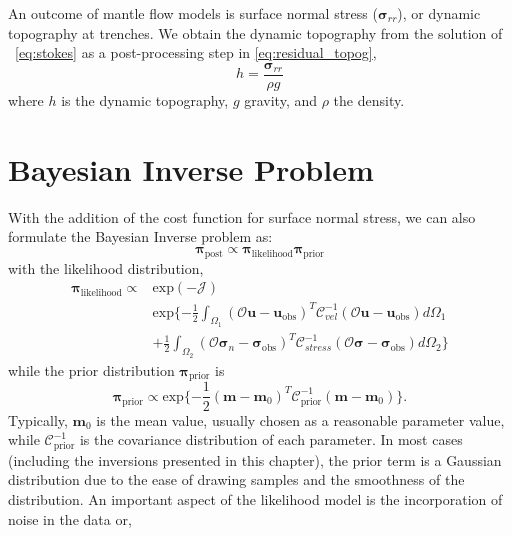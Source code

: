 \documentclass[12pt]{article}
\newcommand{\mm}{{\ensuremath{\boldsymbol{m}}}}
\newcommand{\uu}{{\ensuremath{\boldsymbol{u}}}}
\newcommand{\ppi}{{\ensuremath{\boldsymbol{\pi}}}}
\newcommand{\ssigma}{{\ensuremath{\boldsymbol{\sigma}}}}
\begin{document}
An outcome of mantle flow models is surface normal stress ($\ssigma_{rr}$), or dynamic topography at trenches. We obtain the dynamic topography from the solution of ~\eqref{eq:stokes} as a post-processing step in \eqref{eq:residual_topog},
\begin{equation}
h= \frac{\ssigma_{rr}}{\rho g}
\label{eq:residual_topog}
\end{equation}
where $h$ is the dynamic topography, $g$ gravity, and $\rho$ the density. 


 
\section*{Bayesian Inverse Problem}
With the addition of the cost function for surface normal stress, we can also formulate the Bayesian Inverse problem as:
\begin{equation}
\ppi_{\text{post}} \propto \ppi_{\text{likelihood}}\ppi_{\text{prior}}
\end{equation}
with the likelihood distribution,
\begin{equation}
\begin{split}
\ppi_{\text{likelihood}} \propto & \text{exp}(-\mathcal{J}) \\
                           & \text{exp}\{-\frac{1}{2}\int_{\Omega_1} (\mathcal{O}\uu-\uu_{\text{obs}})^T\mathcal{C}^{-1}_{vel}(\mathcal{O}\uu-\uu_{\text{obs}})d\Omega_1 \\
&+ \frac{1}{2}\int_{\Omega_2} (\mathcal{O}\ssigma_n-\ssigma_{\text{obs}})^T\mathcal{C}^{-1}_{stress}(\mathcal{O}\ssigma -\ssigma_{\text{obs}})d\Omega_2 \} 
\end{split}
\end{equation}
while the prior distribution $\ppi_{\text{prior}}$ is
\begin{equation}
\ppi_{\text{prior}}\propto \text{exp}\{-\frac{1}{2}(\mm-\mm_0)^T\mathcal{C}^{-1}_{\text{prior}}(\mm -\mm_0)\}. 
\end{equation}
Typically, $\mm_0$ is the mean value, usually chosen as a reasonable parameter value, while $\mathcal{C}^{-1}_{\text{prior}}$ is the covariance  distribution of each parameter. In most cases (including the inversions presented in this chapter), the prior term is a Gaussian distribution due to the ease of drawing samples and the smoothness of the distribution. An important aspect of the likelihood model is the incorporation of noise in the data or,
\end{document}
